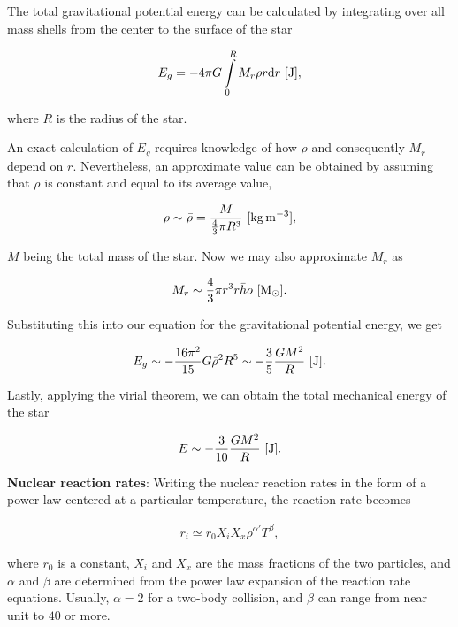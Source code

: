\documentclass[a4paper,10pt]{article}
\begin{document}
{\noindent}The total gravitational potential energy can be calculated by integrating over all mass shells from the center to the surface of the star

\begin{align*}
    E_g = -4\pi G\int\limits_0^R M_r\rho r{\rm d}r ~ [{\rm J}],
\end{align*}

{\noindent}where $R$ is the radius of the star.

{\noindent}An exact calculation of $E_g$ requires knowledge of how $\rho$ and consequently $M_r$ depend on $r$. Nevertheless, an approximate value can be obtained by assuming that $\rho$ is constant and equal to its average value,

\begin{align*}
    \rho \sim \bar{\rho} = \frac{M}{\frac{4}{3}\pi R^3} ~ [{\rm kg\,m^{-3}}],
\end{align*}

{\noindent}$M$ being the total mass of the star. Now we may also approximate $M_r$ as

\begin{align*}
    M_r \sim \frac{4}{3} \pi r^3 \bar{rho} ~ [{\rm M_\odot}].
\end{align*}

{\noindent}Substituting this into our equation for the gravitational potential energy, we get

\begin{align*}
    E_g \sim -\frac{16\pi^2}{15}G\bar{\rho}^2R^5 \sim -\frac{3}{5}\frac{GM^2}{R} ~ [{\rm J}].
\end{align*}

{\noindent}Lastly, applying the virial theorem, we can obtain the total mechanical energy of the star

\begin{align*}
    E \sim -\frac{3}{10}\frac{GM^2}{R} ~ [{\rm J}].
\end{align*}

{\noindent}\textbf{Nuclear reaction rates}: Writing the nuclear reaction rates in the form of a power law centered at a particular temperature, the reaction rate becomes


\begin{align*}
    r_i \simeq r_0X_iX_x\rho^{\alpha'} T^\beta,
\end{align*}

{\noindent}where $r_0$ is a constant, $X_i$ and $X_x$ are the mass fractions of the two particles, and $\alpha$ and $\beta$ are determined from the power law expansion of the reaction rate equations. Usually, $\alpha=2$ for a two-body collision, and $\beta$ can range from near unit to $40$ or more.
\end{document}
